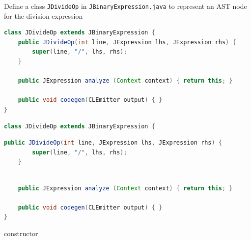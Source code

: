 \documentclass[8pt,a4paper,compress]{beamer}
\begin{document}
\begin{frame}[fragile]
Define a class \lstinline{JDivideOp} in \lstinline{JBinaryExpression.java} to represent an AST node for the division expression

\smallskip

\begin{overprint}
\begin{tcolorbox}[enhanced,drop shadow southwest,sharp corners,size=fbox,colback=white,fontlower=\small\ttfamily,collower=silver900]

\begin{lstlisting}[language=Java,style=focusin]
class JDivideOp extends JBinaryExpression {
    public JDivideOp(int line, JExpression lhs, JExpression rhs) {
        super(line, "/", lhs, rhs);
    }
 
    public JExpression analyze (Context context) { return this; }
    
    public void codegen(CLEmitter output) { }
}
\end{lstlisting}

\tcblower
\begin{minipage}[t][.25cm][t]{\textwidth}

\end{minipage}
\end{tcolorbox}

\begin{tcolorbox}[enhanced,drop shadow southwest,sharp corners,size=fbox,colback=white,fontlower=\small\ttfamily,collower=silver900]

\begin{lstlisting}[language=Java,style=focusin]
class JDivideOp extends JBinaryExpression {
\end{lstlisting}
\begin{lstlisting}[language=Java,style=focusin,backgroundcolor=\color{lime100}]
    public JDivideOp(int line, JExpression lhs, JExpression rhs) {
        super(line, "/", lhs, rhs);
    }
\end{lstlisting}
\begin{lstlisting}[language=Java,style=focusin]
 
    public JExpression analyze (Context context) { return this; }
    
    public void codegen(CLEmitter output) { }
}
\end{lstlisting}

\tcblower
\begin{minipage}[t][.25cm][t]{\textwidth}
constructor
\end{minipage}
\end{tcolorbox}


\end{overprint}
\end{frame}
\end{document}
